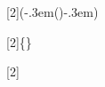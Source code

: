 %
%


%
%
%
%

\newmathcommand{\multbinom}[2]{\left(\kern-.3em\left(\right)\kern-.3em\right)}

%
%
%
%

\newmathcommand{\Stirling}[2]{\left\{\right\}}

%
%
%
%

\newmathcommand{\stirling}[2]{}


